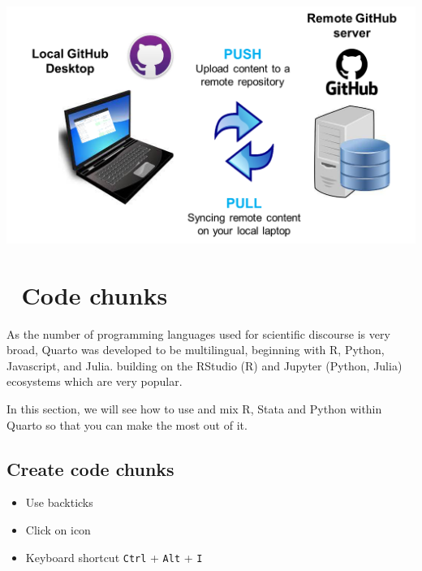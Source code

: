 \documentclass[
  letterpaper,
  DIV=11,
  numbers=noendperiod,
  oneside]{scrreprt}
\providecommand{\tightlist}{%
  \setlength{\itemsep}{0pt}\setlength{\parskip}{0pt}}\usepackage{longtable,booktabs,array}
\begin{document}
\includegraphics{./images/paste-A340C143.png}

\hypertarget{code-chunks-1}{%
\chapter{\texorpdfstring{{📘} Code
chunks}{📘 Code chunks}}\label{code-chunks-1}}

As the number of programming languages used for scientific discourse is
very broad, Quarto was developed to be multilingual, beginning with R,
Python, Javascript, and Julia. building on the RStudio (R) and Jupyter
(Python, Julia) ecosystems which are very popular.

In this section, we will see how to use and mix R, Stata and Python
within Quarto so that you can make the most out of it.

\hypertarget{create-code-chunks}{%
\section{Create code chunks}\label{create-code-chunks}}

\begin{tcolorbox}[enhanced jigsaw, colbacktitle=quarto-callout-tip-color!10!white, titlerule=0mm, breakable, opacityback=0, opacitybacktitle=0.6, left=2mm, coltitle=black, colback=white, title=\textcolor{quarto-callout-tip-color}{\faLightbulb}\hspace{0.5em}{Tip}, rightrule=.15mm, colframe=quarto-callout-tip-color-frame, toprule=.15mm, bottomtitle=1mm, toptitle=1mm, arc=.35mm, bottomrule=.15mm, leftrule=.75mm]

\begin{itemize}
\tightlist
\item
  Use backticks
\item
  Click on icon
\item
  Keyboard shortcut \texttt{Ctrl} + \texttt{Alt} + \texttt{I}
\end{itemize}

\end{tcolorbox}
\end{document}
